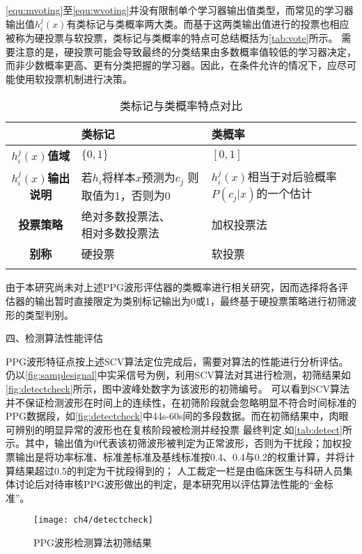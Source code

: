 \autoref{equ:mvoting}至\autoref{equ:wvoting}并没有限制单个学习器输出值类型，而常见的学习器输出值$h_i^j(x)$有类标记与类概率两大类。而基于这两类输出值进行的投票也相应被称为硬投票与软投票，类标记与类概率的特点可总结概括为\autoref{tab:vote}所示。
需要注意的是，硬投票可能会导致最终的分类结果由多数概率值较低的学习器决定，而非少数概率更高、更有分类把握的学习器。因此，在条件允许的情况下，应尽可能使用软投票机制进行决策。
\begin{table}[htbp]
    \centering
    \caption{\label{tab:vote}类标记与类概率特点对比}
    \begin{tabularx}{\linewidth}{c|X<{\centering}X<{\centering}}
        \Xhline{1pt} 
            &\textbf{类标记}&\textbf{类概率}\\
        \hline
        \textbf{$h_i^j(x)$值域}  &$\{0,1\}$    &$[0,1]$     \\
        \textbf{$h_i^j(x)$输出说明}&\tabincell{c}{若$h_i$将样本$x$预测为$c_j$\\则取值为1，否则为0}&\tabincell{c}{$h_i^j(x)$相当于对后验概率\\$P(c_j|x)$的一个估计}\\
        \textbf{投票策略}&\tabincell{c}{绝对多数投票法、\\相对多数投票法}&加权投票法\\
        \textbf{别称}    &硬投票 &软投票 \\
        \Xhline{1pt}
    \end{tabularx}
\end{table}

由于本研究尚未对上述PPG波形评估器的类概率进行相关研究，因而选择将各评估器的输出暂时直接限定为类别标记输出为0或1，最终基于硬投票策略进行初筛波形的类型判别。

四、检测算法性能评估

PPG波形特征点按上述SCV算法定位完成后，需要对算法的性能进行分析评估。仍以\autoref{fig:samplesignal}中实采信号为例，利用SCV算法对其进行检测，初筛结果如\autoref{fig:detectcheck}所示，图中波峰处数字为该波形的初筛编号。
可以看到SCV算法并不保证检测波形在时间上的连续性，在初筛阶段就会忽略明显不符合时间标准的PPG数据段，如\autoref{fig:detectcheck}中44s-60s间的多段数据。而在初筛结果中，肉眼可辨别的明显异常的波形也在复核阶段被检测并经投票
最终判定,如\autoref{tab:detect}所示。其中，输出值为0代表该初筛波形被判定为正常波形，否则为干扰段；加权投票输出是将功率标准、标准差标准及基线标准按0.4、0.4与0.2的权重计算，并将计算结果超过0.5的判定为干扰段得到的；
人工裁定一栏是由临床医生与科研人员集体讨论后对待审核PPG波形做出的判定，是本研究用以评估算法性能的“金标准”。
\begin{figure}[htbp]
    \centering
    \texttt{[image: ch4/detectcheck]}
    \caption{\label{fig:detectcheck}PPG波形检测算法初筛结果}
\end{figure}

